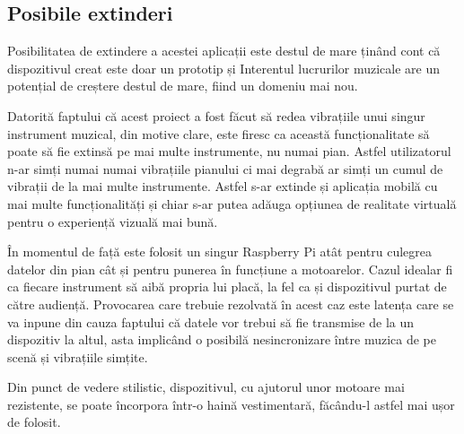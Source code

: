 \documentclass[../IoMusT.tex]{subfiles}
\begin{document}
\subsection{Posibile extinderi}
Posibilitatea de extindere a acestei aplicații este destul de mare ținând cont că dispozitivul creat este doar un prototip și Interentul lucrurilor mu\-zi\-ca\-le are un potențial de creștere destul de mare, fiind un domeniu mai nou.
\\
\par Datorită faptului că acest proiect a fost făcut să redea vibrațiile unui singur instrument muzical, din motive clare, este firesc ca această funcționalitate să poate să fie extinsă pe mai multe instrumente, nu numai pian. Astfel utilizatorul n-ar simți numai numai vibrațiile pianului ci mai degrabă ar simți un cumul de vibrații de la mai multe instrumente. Astfel s-ar extinde și aplicația mobilă cu mai multe funcționalități și chiar s-ar putea adăuga opțiunea de realitate virtuală pentru o experiență vizuală mai bună.
\\
 \par În momentul de față este folosit un singur Raspberry Pi atât pentru culegrea datelor din pian cât și pentru punerea în funcțiune a motoarelor. Cazul idealar fi ca fiecare instrument să aibă propria lui placă, la fel ca și dispozitivul purtat de către audiență. Provocarea care trebuie rezolvată în acest caz este latența care se va inpune din cauza faptului că datele vor trebui să fie transmise de la un dispozitiv la altul, asta implicând o posibilă nesincronizare între muzica de pe scenă și vibrațiile simțite. 
\\
\par Din punct de vedere stilistic, dispozitivul, cu ajutorul unor motoare mai rezistente, se poate încorpora într-o haină vestimentară, făcându-l astfel mai ușor de folosit.
\end{document}
